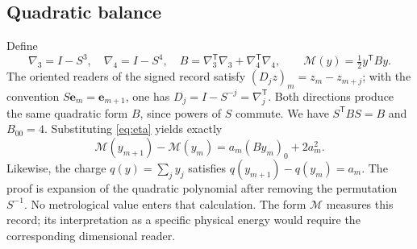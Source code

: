 \subsection{Quadratic balance}
Define
\[
\nabla_3=I-S^3,\quad \nabla_4=I-S^4,\quad
B=\nabla_3^{\mathsf T}\nabla_3+\nabla_4^{\mathsf T}\nabla_4,\qquad
\mathcal M(y)=\tfrac12 y^{\mathsf T}By.
\]
The oriented readers of the signed record satisfy
$(D_jz)_m=z_m-z_{m+j}$; with the convention
$S\mathbf e_m=\mathbf e_{m+1}$, one has
$D_j=I-S^{-j}=\nabla_j^{\mathsf T}$. Both directions produce the same
quadratic form $B$, since powers of $S$ commute.
We have $S^{\mathsf T}BS=B$ and $B_{00}=4$. Substituting
\eqref{eq:eta} yields exactly
\begin{equation}
\mathcal M(y_{m+1})-\mathcal M(y_m)
=a_m(By_m)_0+2a_m^2.
\label{ii:mem:balance}
\end{equation}
Likewise, the charge $q(y)=\sum_jy_j$ satisfies
$q(y_{m+1})-q(y_m)=a_m$.
The proof is expansion of the quadratic polynomial after removing
the permutation $S^{-1}$. No metrological value enters that calculation.
The form $\mathcal M$ measures this record; its interpretation as a
specific physical energy would require the corresponding dimensional reader.




